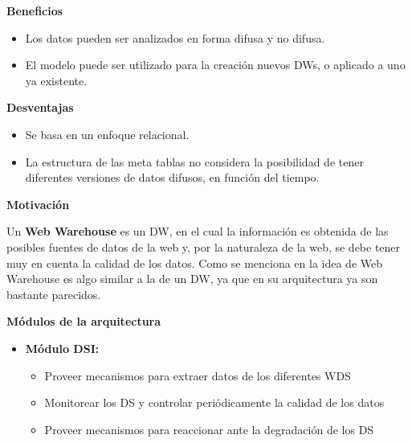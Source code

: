 \documentclass{fancyslides}
\begin{document}
\begin{frame}
\misc
{
\textbf{Beneficios}

\begin{itemize}
  \item \justifying Los datos pueden ser analizados en forma difusa y no difusa.
  \item \justifying El modelo puede ser utilizado para la creación nuevos DWs, o aplicado a uno ya existente.
\end{itemize}

\textbf{Desventajas}

\begin{itemize}
  \item Se basa en un enfoque relacional.
  \item \justifying La estructura de las meta tablas no considera la posibilidad de tener diferentes versiones de datos difusos, en función del tiempo.
\end{itemize}
}

\end{frame}


\begin{frame}
\end{frame}

\begin{frame}
\misc
{ \textbf{Motivación}
\newline

\justifying Un \textbf{Web Warehouse} es un DW, en el cual la información es obtenida de las posibles fuentes de datos de la web y, por la naturaleza de la web, se debe tener muy en cuenta la calidad de los datos. Como se menciona en \cite{WWPaper} la idea de Web Warehouse es algo similar a la de un DW, ya que en su arquitectura ya son bastante parecidos.

}
\end{frame}



\begin{frame}
\end{frame}


\begin{frame}
\misc
{ \textbf{\Large Módulos de la arquitectura}
\newline
\newline

\begin{itemize}
  \item \textbf{Módulo DSI:} 
    \begin{itemize}
      \item Proveer mecanismos para extraer datos de los diferentes WDS
      \item Monitorear los DS y controlar periódicamente la calidad de los datos
      \item Proveer mecanismos para reaccionar ante la degradación de los DS
    \end{itemize}
\end{itemize}

}
\end{frame}
\end{document}

